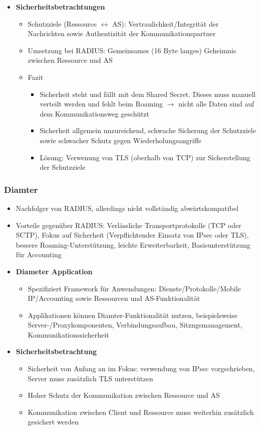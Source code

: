 \begin{itemize}
\begin{itemize}
	\end{itemize}
	\item \textbf{Sicherheitsbetrachtungen}
	\begin{itemize}
		\item Schutzziele (Ressource \(\leftrightarrow\) AS): Vertraulichkeit/Integrität der Nachrichten sowie Authentizität der Kommunikationspartner
		\item Umsetzung bei RADIUS: Gemeinsames (16 Byte langes) Geheimnis zwischen Ressource und AS
		\item Fazit
		\begin{itemize}
			\item Sicherheit steht und fällt mit dem Shared Secret. Dieses muss manuell verteilt werden und fehlt beim Roaming \(\rightarrow\) nicht alle Daten sind auf dem Kommunikationsweg geschützt
			\item Sicherheit allgemein unzureichend, schwache Sicherung der Schutzziele sowie schwacher Schutz gegen Wiederholungsangriffe
			\item Lösung: Verwenung von TLS (oberhalb von TCP) zur Sicherstellung der Schutzziele
		\end{itemize}
	\end{itemize}
\end{itemize}

\subsubsection{Diamter}
\begin{itemize}
	\item Nachfolger von RADIUS, allerdings nicht vollständig abwärtskompatibel
	\item Vorteile gegenüber RADIUS: Verlässliche Transportprotokolle (TCP oder SCTP), Fokus auf Sicherheit (Verpflichtender Einsatz von IPsec oder TLS), bessere Roaming-Unterstützung, leichte Erweiterbarkeit, Basisunterstützung für Accounting
	\item \textbf{Diameter Application}
	\begin{itemize}
		\item Spezifiziert Framework für Anwendungen: Dienste/Protokolle/Mobile IP/Accounting sowie Ressourcen und AS-Funktionalität
		\item Applikationen können Diamter-Funktionalität nutzen, beispielsweise Server-/Proxykomponenten, Verbindungsaufbau, Sitzngsmanagement, Kommunikationssicherheit
	\end{itemize}
	\item \textbf{Sicherheitsbetrachtung}
	\begin{itemize}
		\item Sicherheit von Anfang an im Fokus: verwendung von IPsec vorgschrieben, Server muss zusätzlich TLS unterstützen
		\item Hoher Schutz der Kommunikation zwischen Ressource und AS
		\item Kommunikation zwischen Client und Ressource muss weiterhin zusätzlich gesichert werden
	\end{itemize}
\end{itemize}



